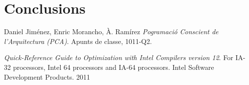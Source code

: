 \documentclass[final,a4paper,11pt,catalan]{report}
\begin{document}


\tableofcontents
\newpage





\chapter{Conclusions}

\begin{thebibliography}{9}

  Daniel Jiménez, Enric Morancho, À. Ramírez
  \emph{Pogramació Conscient de l'Arquitectura (PCA)}.
  Apunts de classe,
  1011-Q2.

  \emph{Quick-Reference Guide to Optimization with Intel Compilers version 12}. For IA-32 processors, Intel 64 processors and IA-64 processors. Intel Software Development Products. 2011


\end{thebibliography}
\end{document}
